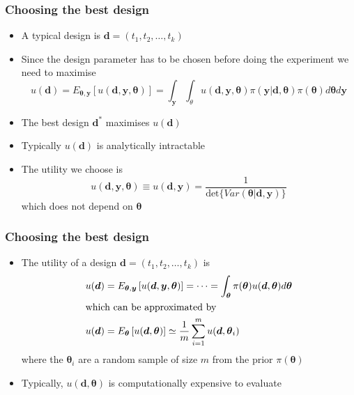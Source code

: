 \documentclass[t,compress]{beamer}
\newcommand{\by}{\boldsymbol{y}}
\newcommand{\btheta}{\boldsymbol{\theta}}
\newcommand{\bd}{\boldsymbol{d}}
\begin{document}
\begin{frame}
\frametitle{Choosing the best design}
\begin{itemize}
\item A typical design is $\bd = (t_1, t_2, \ldots, t_k)$
\item Since the design parameter has to be chosen before doing the experiment we need to maximise 
\[
u(\bd) = E_{\btheta,\by}[u(\bd,\by,\btheta)]=\int_{\by}\int_{\theta}u(\bd,\by,\btheta)\pi(\by|\bd,\btheta)\pi(\btheta)d\btheta d\by
\]
\item The best design $\bd^{\ast}$ maximises $u(\bd)$ 
\item Typically $u(\bd)$ is analytically intractable
\item The utility we choose is
\begin{equation*}
u(\bd,\by,\btheta)\equiv u(\bd,\by)
=\frac{1}{\text{det}\{Var(\btheta | \bd,\by)\}}
\end{equation*}
which does not depend on $\btheta$

\end{itemize} 
\end{frame}



\begin{frame}
\frametitle{Choosing the best design}
\begin{itemize}
\item The utility of a design $\bd = (t_1, t_2, \ldots, t_k)$ is
\begin{align*}
u(\bd)&=E_{\btheta,\by}\left[u(\bd,\by,\btheta)\right] = \cdots 
=\int_{\btheta} \pi(\btheta) u(\bd,\btheta) d \btheta \\
\intertext{which can be approximated by}
u(\bd) &= E_{\btheta}\left[u(\bd,\btheta)\right] \simeq \frac{1}{m}\sum_{i=1}^{m} u(\bd,\btheta_i)
\end{align*} 
where the $\btheta_i$ are a random sample of size $m$ from the prior $\pi(\btheta)$
\item Typically, $u(\bd, \btheta)$ is computationally expensive to evaluate
\end{itemize}
\end{frame}
\end{document}
